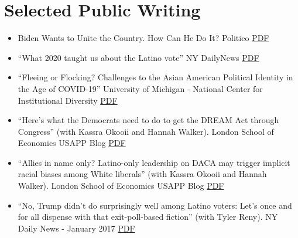 \documentclass[11pt,letterpaper]{moderncv}
\newcommand{\faFilePdf}[1][]{PDF}
\begin{document}
\clearpage
\section{Selected Public Writing}
\begin{itemize}

\item Biden Wants to Unite the Country. How Can He Do It? Politico \href{https://www.politico.com/news/magazine/2021/01/20/president-biden-administration-unity-healing-policies-experts-ideas-inauguration-roundup-460470} {\textcolor{myblue}{\faFilePdf[regular]}} 

\item ``What 2020 taught us about the Latino vote'' NY DailyNews \href{https://www.nydailynews.com/opinion/ny-oped-what-2020-taught-us-about-the-latino-vote-20201111-zcwzshjb5bcrtmyctjlw6tlzka-story.html} {\textcolor{myblue}{\faFilePdf[regular]}} 

\item ``Fleeing or Flocking? Challenges to the Asian American Political Identity in the Age of COVID-19'' University of Michigan - National Center for Institutional Diversity \href{https://medium.com/national-center-for-institutional-diversity/fleeing-or-flocking-challenges-to-the-asian-american-political-identity-in-the-age-of-covid-19-8f750bdf6a10} {\textcolor{myblue}{\faFilePdf[regular]}} 


\item ``Here's what the Democrats need to do to get the DREAM Act through Congress'' (with Kassra Okooii and Hannah Walker). London School of Economics USAPP Blog  \href{https://blogs.lse.ac.uk/usappblog/2018/01/29/heres-what-the-democrats-need-to-do-to-get-the-dream-act-through-congress/}{\textcolor{myblue}{\faFilePdf[regular]} }

\item ``Allies in name only? Latino-only leadership on DACA may trigger implicit racial biases among White liberals'' (with Kassra Okooii and Hannah Walker). London School of Economics USAPP Blog \href{https://blogs.lse.ac.uk/usappblog/2017/09/28/allies-in-name-only-latino-only-leadership-on-daca-may-trigger-implicit-racial-biases-among-white-liberals/}{\textcolor{myblue}{\faFilePdf[regular]} }

\item  ``No, Trump didn't do surprisingly well among Latino voters: Let's once and for all dispense with that exit-poll-based fiction'' (with Tyler Reny). NY Daily News - January 2017 \href{https://www.nydailynews.com/opinion/no-trump-didn-surprisingly-latino-voters-article-1.2944772}{\textcolor{myblue}{\faFilePdf[regular]} }


\end{itemize}
\end{document}
